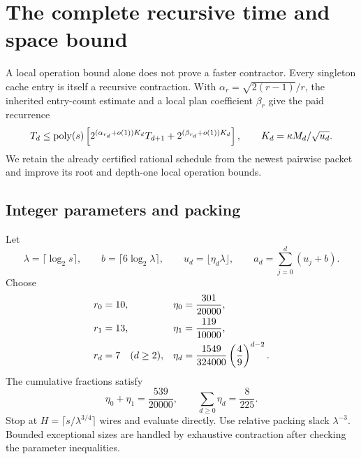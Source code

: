 \section{The complete recursive time and space bound}\label{sec:schedule}

A local operation bound alone does not prove a faster contractor. Every
singleton cache entry is itself a recursive contraction. With
\(\alpha_r=\sqrt{2(r-1)}/r\), the inherited entry-count estimate and a
local plan coefficient \(\beta_r\) give the paid recurrence
\begin{equation}\label{eq:paid}
 T_d\le\operatorname{poly}(s)
 \left[
    2^{(\alpha_{r_d}+o(1))K_d}T_{d+1}
    +2^{(\beta_{r_d}+o(1))K_d}
 \right],
 \qquad K_d=\kappa M_d/\sqrt{u_d}.
\end{equation}
We retain the already certified rational schedule from the newest
pairwise packet and improve its root and depth-one local operation bounds.

\subsection{Integer parameters and packing}

Let
\[
 \lambda=\lceil\log_2s\rceil,\qquad
 b=\lceil6\log_2\lambda\rceil,\qquad
 u_d=\lfloor\eta_d\lambda\rfloor,\qquad
 a_d=\sum_{j=0}^d(u_j+b).
\]
Choose
\begin{align}
 r_0&=10,&\eta_0&=\frac{301}{20000},\notag\\
 r_1&=13,&\eta_1&=\frac{119}{10000},\notag\\
 r_d&=7\quad(d\ge2),&
 \eta_d&=\frac{1549}{324000}
                 \left(\frac49\right)^{d-2}.\label{eq:schedule}
\end{align}
The cumulative fractions satisfy
\[
 \eta_0+\eta_1=\frac{539}{20000},\qquad
 \sum_{d\ge0}\eta_d=\frac8{225}.
\]
Stop at \(H=\lceil s/\lambda^{3/4}\rceil\) wires and evaluate directly.
Use relative packing slack \(\lambda^{-3}\).
Bounded exceptional sizes are handled by exhaustive contraction after
checking the parameter inequalities.

